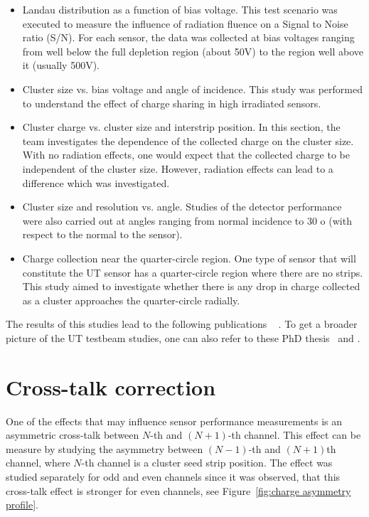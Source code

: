 \begin{itemize}
\item Landau distribution as a function of bias voltage. This test scenario was executed to measure the influence of radiation fluence on a Signal to Noise ratio (S/N).  For each sensor, the data was collected at bias voltages ranging from well below the full depletion region (about 50V) to the region well above it (usually 500V).
\item  Cluster size vs. bias voltage and angle of incidence. This study was performed to understand the effect of charge sharing in high irradiated sensors. 
\item Cluster charge vs. cluster size and interstrip position. In this section, the team investigates the dependence of the collected charge on the cluster size. With no radiation effects, one would expect that the collected charge to be independent of the cluster size. However, radiation effects can lead to a difference which was investigated. 
\item Cluster size and resolution vs. angle.  Studies of the detector performance were also carried out at angles ranging from normal incidence to 30 o (with respect to the normal to the sensor). 
\item Charge collection near the quarter-circle region. One type of sensor that will constitute the UT sensor has a quarter-circle region where there are no strips. This study aimed to investigate whether there is any drop in charge collected as a cluster approaches the quarter-circle radially. 
\end{itemize}

The results of this studies lead to the following publications ~\cite{tb1}  \cite{tb2} \cite{tb3}. To get a broader picture of the UT testbeam studies, one can also refer to these PhD thesis~\cite{Federica} and \cite{Kelsey}.


\section{Cross-talk correction}
\label{sec:cross_talk}
One of the effects that may influence sensor performance measurements is an asymmetric cross-talk between $N$-th and $(N+1)$-th channel. This effect can be measure by studying the asymmetry between $(N-1)$-th and $(N+1)$th channel, where $N$-th channel is a cluster seed strip position. The effect was studied separately for odd and even channels since it was observed, that this cross-talk effect is stronger for even channels, see Figure~\ref{fig:charge asymmetry profile}.  


